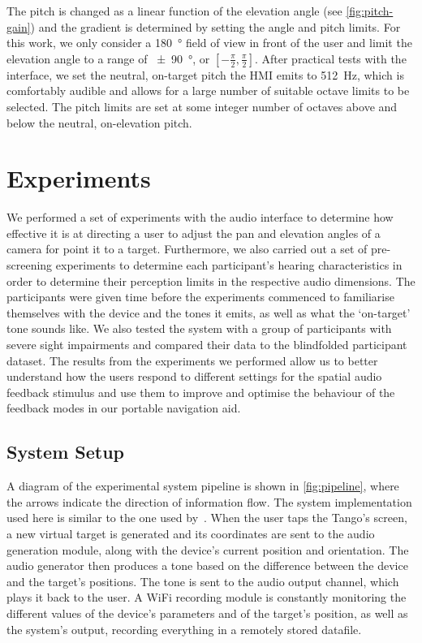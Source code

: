 \documentclass[acmsmall]{acmart}
\begin{document}
The pitch is changed as a linear function of the elevation angle (see \cref{fig:pitch-gain}) and the gradient is determined by setting the angle and pitch limits.
For this work, we only consider a \SI{180}{\degree} field of view in front of the user and limit the elevation angle to a range of \SI{\pm90}{\degree}, or $[-\frac{\pi}{2}, \frac{\pi}{2}]$.
After practical tests with the interface, we set the neutral, on-target pitch the HMI emits to \SI{512}{\hertz}, which is comfortably audible and allows for a large number of suitable octave limits to be selected.
The pitch limits are set at some integer number of octaves above and below the neutral, on-elevation pitch.

\section{Experiments}\label{sec:experiments}

We performed a set of experiments with the audio interface to determine how effective it is at directing a user to adjust the pan and elevation angles of a camera for point it to a target.
Furthermore, we also carried out a set of pre-screening experiments to determine each participant's hearing characteristics in order to determine their perception limits in the respective audio dimensions.
The participants were given time before the experiments commenced to familiarise themselves with the device and the tones it emits, as well as what the `on-target' tone sounds like.
We also tested the system with a group of participants with severe sight impairments and compared their data to the blindfolded participant dataset.
The results from the experiments we performed allow us to better understand how the users respond to different settings for the spatial audio feedback stimulus and use them to improve and optimise the behaviour of the feedback modes in our portable navigation aid.

\subsection{System Setup}

A diagram of the experimental system pipeline is shown in \cref{fig:pipeline}, where the arrows indicate the direction of information flow.
The system implementation used here is similar to the one used by~\citet{lock2019bone}.
When the user taps the Tango's screen, a new virtual target is generated and its coordinates are sent to the audio generation module, along with the device's current position and orientation.
The audio generator then produces a tone based on the difference between the device and the target's positions.
The tone is sent to the audio output channel, which plays it back to the user.
A WiFi recording module is constantly monitoring the different values of the device's parameters and of the target's position, as well as the system's output, recording everything in a remotely stored datafile. 
\end{document}
